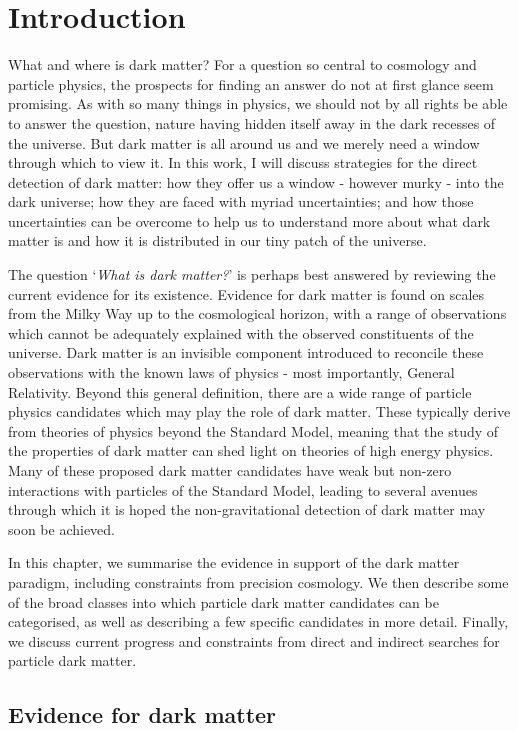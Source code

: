 \chapter{Introduction}
What and where is dark matter? For a question so central to cosmology and particle physics, the prospects for finding an answer do not at first glance seem promising. As with so many things in physics, we should not by all rights be able to answer the question, nature having hidden itself away in the dark recesses of the universe. But dark matter is all around us and we merely need a window through which to view it. In this work, I will discuss strategies for the direct detection of dark matter: how they offer us a window - however murky - into the dark universe; how they are faced with myriad  uncertainties; and how those uncertainties can be overcome to help us to understand more about what dark matter is and how it is distributed in our tiny patch of the universe.

The question `\textit{What is dark matter?}' is perhaps best answered by reviewing the current evidence for its existence. Evidence for dark matter is found on scales from the Milky Way up to the cosmological horizon, with a range of observations which cannot be adequately explained with the observed constituents of the universe. Dark matter is an invisible component introduced to reconcile these observations with the known laws of physics - most importantly, General Relativity. Beyond this general definition, there are a wide range of particle physics candidates which may play the role of dark matter. These typically derive from theories of physics beyond the Standard Model, meaning that the study of the properties of dark matter can shed light on theories of high energy physics. Many of these proposed dark matter candidates have weak but non-zero interactions with particles of the Standard Model, leading to several avenues through which it is hoped the non-gravitational detection of dark matter may soon be achieved.

In this chapter, we summarise the evidence in support of the dark matter paradigm, including constraints from precision cosmology. We then describe some of the broad classes into which particle dark matter candidates can be categorised, as well as describing a few specific candidates in more detail. Finally, we discuss current progress and constraints from direct and indirect searches for particle dark matter.

\section{Evidence for dark matter}

